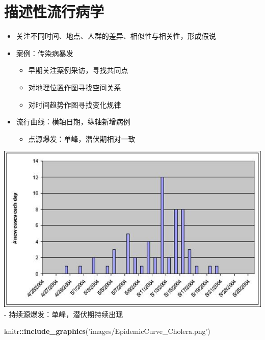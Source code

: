 \documentclass[]{book}
\newenvironment{Shaded}{\begin{snugshade}}{\end{snugshade}}
\newcommand{\KeywordTok}[1]{\textcolor[rgb]{0.13,0.29,0.53}{\textbf{#1}}}
\newcommand{\NormalTok}[1]{#1}
\newcommand{\OperatorTok}[1]{\textcolor[rgb]{0.81,0.36,0.00}{\textbf{#1}}}
\newcommand{\StringTok}[1]{\textcolor[rgb]{0.31,0.60,0.02}{#1}}
\providecommand{\tightlist}{%
  \setlength{\itemsep}{0pt}\setlength{\parskip}{0pt}}
\begin{document}
\section{描述性流行病学}

\begin{itemize}
\tightlist
\item
  关注不同时间、地点、人群的差异、相似性与相关性，形成假说
\item
  案例：传染病暴发

  \begin{itemize}
  \tightlist
  \item
    早期关注案例采访，寻找共同点
  \item
    对地理位置作图寻找空间关系
  \item
    对时间趋势作图寻找变化规律
  \end{itemize}
\item
  流行曲线：横轴日期，纵轴新增病例

  \begin{itemize}
  \tightlist
  \item
    点源爆发：单峰，潜伏期相对一致
  \end{itemize}
\end{itemize}

\begin{Shaded}
\end{Shaded}

\includegraphics{images/epidemic curve.jpg}
- 持续源爆发：单峰，潜伏期持续出现

\begin{Shaded}
\begin{Highlighting}[]
\NormalTok{knitr}\OperatorTok{::}\KeywordTok{include_graphics}\NormalTok{(}\StringTok{'images/EpidemicCurve_Cholera.png'}\NormalTok{)}
\end{Highlighting}
\end{Shaded}
\end{document}
